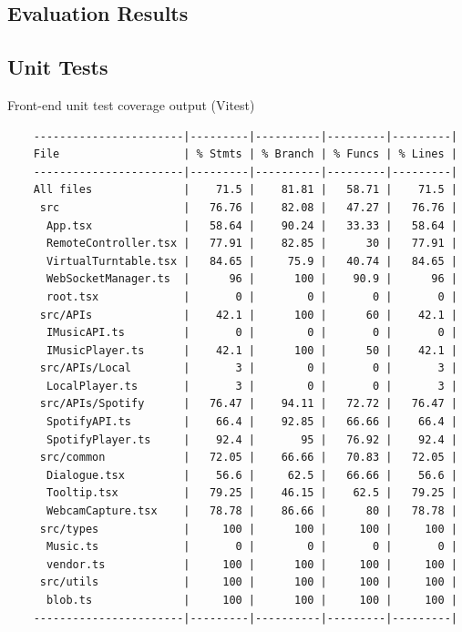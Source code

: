\begin{uomappendix}
        \section{Evaluation Results}
    
            \subsection{Unit Tests}
                \begin{table}[H]
                    \centering
                    \caption{Front-end unit test coverage output (Vitest)}
                    \begin{verbatim}
    -----------------------|---------|----------|---------|---------|
    File                   | % Stmts | % Branch | % Funcs | % Lines |
    -----------------------|---------|----------|---------|---------|
    All files              |    71.5 |    81.81 |   58.71 |    71.5 |
     src                   |   76.76 |    82.08 |   47.27 |   76.76 |
      App.tsx              |   58.64 |    90.24 |   33.33 |   58.64 |
      RemoteController.tsx |   77.91 |    82.85 |      30 |   77.91 |
      VirtualTurntable.tsx |   84.65 |     75.9 |   40.74 |   84.65 |
      WebSocketManager.ts  |      96 |      100 |    90.9 |      96 |
      root.tsx             |       0 |        0 |       0 |       0 |
     src/APIs              |    42.1 |      100 |      60 |    42.1 |
      IMusicAPI.ts         |       0 |        0 |       0 |       0 |
      IMusicPlayer.ts      |    42.1 |      100 |      50 |    42.1 |
     src/APIs/Local        |       3 |        0 |       0 |       3 |
      LocalPlayer.ts       |       3 |        0 |       0 |       3 |
     src/APIs/Spotify      |   76.47 |    94.11 |   72.72 |   76.47 |
      SpotifyAPI.ts        |    66.4 |    92.85 |   66.66 |    66.4 |
      SpotifyPlayer.ts     |    92.4 |       95 |   76.92 |    92.4 |
     src/common            |   72.05 |    66.66 |   70.83 |   72.05 |
      Dialogue.tsx         |    56.6 |     62.5 |   66.66 |    56.6 |
      Tooltip.tsx          |   79.25 |    46.15 |    62.5 |   79.25 |
      WebcamCapture.tsx    |   78.78 |    86.66 |      80 |   78.78 |
     src/types             |     100 |      100 |     100 |     100 |
      Music.ts             |       0 |        0 |       0 |       0 |
      vendor.ts            |     100 |      100 |     100 |     100 |
     src/utils             |     100 |      100 |     100 |     100 |
      blob.ts              |     100 |      100 |     100 |     100 |
    -----------------------|---------|----------|---------|---------|
                    \end{verbatim}
                \end{table}
    

\end{uomappendix}
